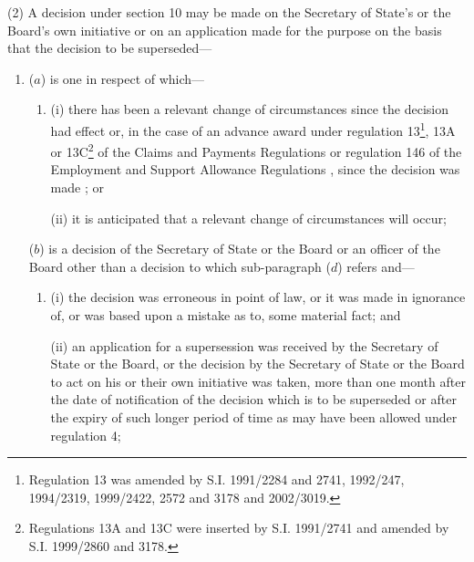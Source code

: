 \documentclass[12pt,a4paper]{article}
\begin{document}
(2) A decision under section 10 may be made on the Secretary of State’s 
or the Board's  %
own initiative or on an application made for the purpose on the basis that the decision to be superseded—
\begin{enumerate}\item[]
($a$) is one in respect of which—
\begin{enumerate}\item[]
(i) there has been a relevant change of circumstances since the decision 
had effect  %
or, in the case of an advance award under regulation 13\footnote{Regulation 13 was amended by S.I. 1991/2284 and 2741, 1992/247, 1994/2319, 1999/2422, 2572 and 3178 and 2002/3019.}, 13A or 13C\footnote{Regulations 13A and 13C were inserted by S.I. 1991/2741 and amended by S.I. 1999/2860 and 3178.} of the Claims and Payments Regulations
or regulation 146 of the Employment and Support Allowance Regulations%
, since the decision was made%
; or

(ii) it is anticipated that a relevant change of circumstances will occur;
\end{enumerate}

($b$) is a decision of the Secretary of State 
or the Board or an officer of the Board  %
other than a decision to which sub-paragraph ($d$) refers and—
\begin{enumerate}\item[]
(i) the decision was erroneous in point of law, or it was made in ignorance of, or was based upon a mistake as to, some material fact; and

(ii) an application for a supersession was received by the Secretary of State
or the Board,  %
or the decision by the Secretary of State 
or the Board  %
to act on his 
or their  %
own initiative was taken, more than one month after the date of notification of the decision which is to be superseded or after the expiry of such longer period of time as may have been allowed under regulation 4;
\end{enumerate}



\end{enumerate}
\end{document}
